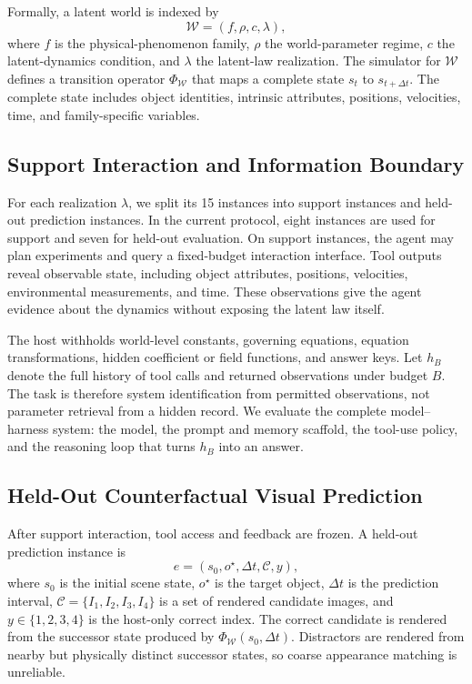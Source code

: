 Formally, a latent world is indexed by
\begin{equation}
  \mathcal{W} = (f, \rho, c, \lambda),
  \label{eq:latent-world}
\end{equation}
where $f$ is the physical-phenomenon family, $\rho$ the world-parameter regime, $c$ the latent-dynamics condition, and $\lambda$ the latent-law realization. The simulator for $\mathcal{W}$ defines a transition operator $\Phi_{\mathcal{W}}$ that maps a complete state $s_t$ to $s_{t+\Delta t}$. The complete state includes object identities, intrinsic attributes, positions, velocities, time, and family-specific variables.

\subsection{Support Interaction and Information Boundary}

For each realization $\lambda$, we split its 15 instances into support instances and held-out prediction instances. In the current protocol, eight instances are used for support and seven for held-out evaluation. On support instances, the agent may plan experiments and query a fixed-budget interaction interface. Tool outputs reveal observable state, including object attributes, positions, velocities, environmental measurements, and time. These observations give the agent evidence about the dynamics without exposing the latent law itself.

The host withholds world-level constants, governing equations, equation transformations, hidden coefficient or field functions, and answer keys. Let $h_B$ denote the full history of tool calls and returned observations under budget $B$. The task is therefore system identification from permitted observations, not parameter retrieval from a hidden record. We evaluate the complete model--harness system: the model, the prompt and memory scaffold, the tool-use policy, and the reasoning loop that turns $h_B$ into an answer.

\subsection{Held-Out Counterfactual Visual Prediction}

After support interaction, tool access and feedback are frozen. A held-out prediction instance is
\begin{equation}
  e = (s_0, o^\star, \Delta t, \mathcal{C}, y),
  \label{eq:prediction-instance}
\end{equation}
where $s_0$ is the initial scene state, $o^\star$ is the target object, $\Delta t$ is the prediction interval, $\mathcal{C}=\{I_1,I_2,I_3,I_4\}$ is a set of rendered candidate images, and $y\in\{1,2,3,4\}$ is the host-only correct index. The correct candidate is rendered from the successor state produced by $\Phi_{\mathcal{W}}(s_0,\Delta t)$. Distractors are rendered from nearby but physically distinct successor states, so coarse appearance matching is unreliable.

